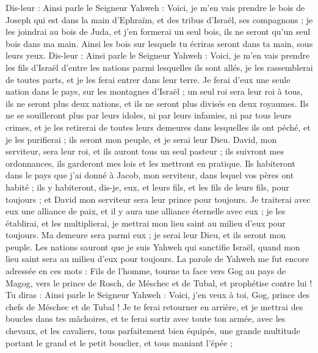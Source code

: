 \begin{multicols}{2}
Dis-leur : Ainsi parle le Seigneur Yahweh : Voici, je m'en vais prendre le bois de Joseph qui est dans la main d'Ephraïm, et des tribus d'Israël, ses compagnons ; je les joindrai au bois de Juda, et j'en formerai un seul bois, ils ne seront qu'un seul bois dans ma main.
Ainsi les bois sur lesquels tu écriras seront dans ta main, sous leurs yeux.
Dis-leur : Ainsi parle le Seigneur Yahweh : Voici, je m'en vais prendre les fils d'Israël d'entre les nations parmi lesquelles ils sont allés, je les rassemblerai de toutes parts, et je les ferai entrer dans leur terre.
Je ferai d'eux une seule nation dans le pays, sur les montagnes d'Israël ; un seul roi sera leur roi à tous, ils ne seront plus deux nations, et ils ne seront plus divisés en deux royaumes.
Ils ne se souilleront plus par leurs idoles, ni par leurs infamies, ni par tous leurs crimes, et je les retirerai de toutes leurs demeures dans lesquelles ils ont péché, et je les purifierai ; ils seront mon peuple, et je serai leur Dieu.
David, mon serviteur, sera leur roi, et ils auront tous un seul pasteur ; ils suivront mes ordonnances, ils garderont mes lois et les mettront en pratique.
Ils habiteront dans le pays que j'ai donné à Jacob, mon serviteur, dans lequel vos pères ont habité ; ils y habiteront, dis-je, eux, et leurs fils, et les fils de leurs fils, pour toujours ; et David mon serviteur sera leur prince pour toujours.
Je traiterai avec eux une alliance de paix, et il y aura une alliance éternelle avec eux ; je les établirai, et les multiplierai, je mettrai mon lieu saint au milieu d'eux pour toujours.
Ma demeure sera parmi eux ; je serai leur Dieu, et ils seront mon peuple.
Les nations sauront que je suis Yahweh qui sanctifie Israël, quand mon lieu saint sera au milieu d'eux pour toujours.
\VerseOne{}La parole de Yahweh me fut encore adressée en ces mots :
Fils de l'homme, tourne ta face vers Gog au pays de Magog, vers le prince de Rosch, de Méschec et de Tubal, et prophétise contre lui !
Tu diras : Ainsi parle le Seigneur Yahweh : Voici, j'en veux à toi, Gog, prince des chefs de Méschec et de Tubal !
Je te ferai retourner en arrière, et je mettrai des boucles dans tes mâchoires, et te ferai sortir avec toute ton armée, avec les chevaux, et les cavaliers, tous parfaitement bien équipés, une grande multitude portant le grand et le petit bouclier, et tous maniant l'épée ;

\end{multicols}
